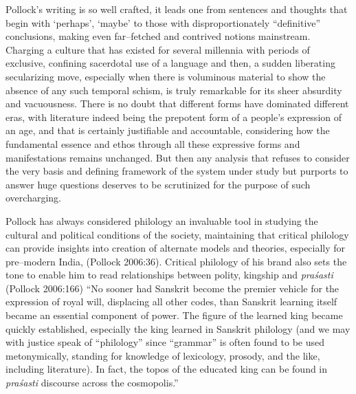 Pollock’s writing is so well crafted, it leads one from sentences and thoughts that begin with ‘perhaps’, ‘maybe’ to those with disproportionately “definitive” conclusions, making even far–fetched and contrived notions mainstream. Charging a culture that has existed for several millennia with periods of exclusive, confining sacerdotal use of a language and then, a sudden liberating secularizing move, especially when there is voluminous material to show the absence of any such temporal schism, is truly remarkable for its sheer absurdity and vacuousness. There is no doubt that different forms have dominated different eras, with literature indeed being the prepotent form of a people’s expression of an age, and that is certainly justifiable and accountable, considering how the fundamental essence and ethos through all these expressive forms and manifestations remains unchanged. But then any analysis that refuses to consider the very basis and defining framework of the system under study but purports to answer huge questions deserves to be scrutinized for the purpose of such overcharging.

Pollock has always considered philology an invaluable tool in studying the cultural and political conditions of the society, maintaining that critical philology can provide insights into creation of alternate models and theories, especially for pre–modern India, (Pollock 2006:36). Critical philology of his brand also sets the tone to enable him to read relationships between polity, kingship and \textit{praśasti} (Pollock 2006:166) “No sooner had Sanskrit become the premier vehicle for the expression of royal will, displacing all other codes, than Sanskrit learning itself became an essential component of power. The figure of the learned king became quickly established, especially the king learned in Sanskrit philology (and we may with justice speak of “philology” since “grammar” is often found to be used metonymically, standing for knowledge of lexicology, prosody, and the like, including literature). In fact, the topos of the educated king can be found in \textit{praśasti} discourse across the cosmopolis.”

